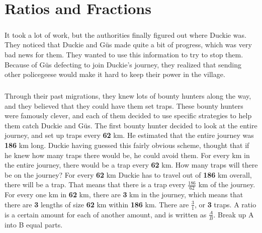 \chapter{Ratios and Fractions}
\paragraph{} It took a lot of work, but the authorities finally figured out where Duckie was. They noticed that Duckie and Güs made quite a bit of progress, which was very bad news for them. They wanted to use this information to try to stop them. Because of Güs defecting to join Duckie's journey, they realized that sending other policegeese would make it hard to keep their power in the village. 
\paragraph{} Through their past migrations, they knew lots of bounty hunters along the way, and they believed that they could have them set traps. These bounty hunters were famously clever, and each of them decided to use specific strategies to help them catch Duckie and Güs.
\vfill
\pagebreak
{The first bounty hunter decided to look at the entire journey, and set up traps every \textbf{62} km. He estimated that the entire journey was \textbf{186} km long. Duckie having guessed this fairly obvious scheme,  thought that if he knew how many traps there would be, he could avoid them. For every km in the entire journey, there would be a trap every \textbf{62} km. How many traps will there be on the journey?}
{For every \textbf{62} km Duckie has to travel out of \textbf{186} km overall, there will be a trap. That means that there is a trap every $\frac{186}{62}$ km of the journey. For every one km in \textbf{62} km, there are \textbf{3} km in the journey, which means that there are \textbf{3} lengths of size \textbf{62} km within \textbf{186} km. There are $\frac{3}{1}$, or \textbf{3} traps.}
{A ratio is a certain amount for each of another amount, and is written as $\frac{A}{B}$. Break up A into B equal parts.}
{}
